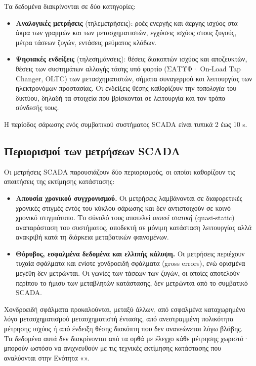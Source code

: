 Τα δεδομένα διακρίνονται σε δύο κατηγορίες:

\begin{itemize}
\item \textbf{Αναλογικές μετρήσεις} (τηλεμετρήσεις): ροές ενεργής και άεργης ισχύος στα
      άκρα των γραμμών και των μετασχηματιστών, εγχύσεις ισχύος στους ζυγούς, μέτρα τάσεων
      ζυγών, εντάσεις ρεύματος κλάδων.
\item \textbf{Ψηφιακές ενδείξεις} (τηλεσημάνσεις): θέσεις διακοπτών ισχύος και αποζευκτών,
      θέσεις των συστημάτων αλλαγής τάσης υπό φορτίο (ΣΑΤΥΦ· On-Load Tap Changer, OLTC) των
      μετασχηματιστών, σήματα συναγερμού και
      λειτουργίας των ηλεκτρονόμων προστασίας. Οι ενδείξεις θέσης καθορίζουν την
      \emph{τοπολογία} του δικτύου, δηλαδή τα στοιχεία που βρίσκονται σε λειτουργία και τον
      τρόπο σύνδεσής τους.
\end{itemize}

Η περίοδος σάρωσης ενός συμβατικού συστήματος SCADA είναι τυπικά 2 έως 10 s.

\subsection{Περιορισμοί των μετρήσεων SCADA}

Οι μετρήσεις SCADA παρουσιάζουν δύο περιορισμούς, οι οποίοι καθορίζουν τις απαιτήσεις της
εκτίμησης κατάστασης:

\begin{itemize}
\item \textbf{Απουσία χρονικού συγχρονισμού.} Οι μετρήσεις λαμβάνονται σε διαφορετικές
      χρονικές στιγμές εντός του κύκλου σάρωσης και δεν αντιστοιχούν σε κοινό χρονικό
      στιγμιότυπο. Το σύνολό τους αποτελεί \emph{οιονεί στατική} (quasi-static)
      αναπαράσταση του συστήματος, αποδεκτή σε μόνιμη κατάσταση λειτουργίας αλλά
      ανακριβή κατά τη διάρκεια μεταβατικών φαινομένων.
\item \textbf{Θόρυβος, εσφαλμένα δεδομένα και ελλιπής κάλυψη.} Οι μετρήσεις περιέχουν
      τυχαία σφάλματα και ενίοτε χονδροειδή σφάλματα (gross errors), ενώ ορισμένα μεγέθη
      δεν μετρώνται. Οι γωνίες των τάσεων των ζυγών, οι οποίες αποτελούν περίπου το ήμισυ των
      μεταβλητών κατάστασης, δεν μετρώνται από το συμβατικό SCADA.
\end{itemize}

Χονδροειδή σφάλματα προκαλούνται, μεταξύ άλλων, από εσφαλμένα καταχωρημένο λόγο
μετασχηματισμού μετασχηματιστή έντασης, από ανεστραμμένη πολικότητα μέτρησης ισχύος ή από
ένδειξη θέσης διακόπτη που δεν ανανεώνεται λόγω βλάβης. Τα δεδομένα αυτά δεν διακρίνονται
από τα ορθά με έλεγχο κάθε μέτρησης χωριστά· μπορούν ωστόσο να ανιχνευθούν με τις τεχνικές εκτίμησης κατάστασης που αναλύονται στην Ενότητα «».
